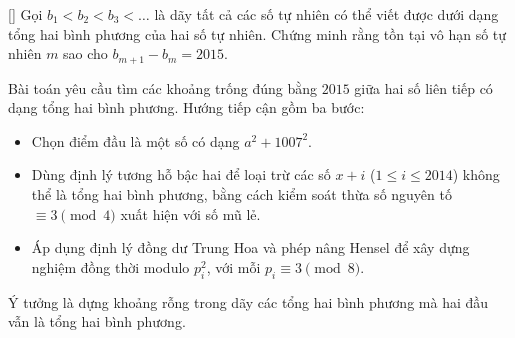 \documentclass[../09-contruction-methods.tex]{subfiles}
\begin{document}
\begin{example*}\label{example:IRN-2015-TST-D1-P3}[\textbf{}]
	Gọi \( b_1 < b_2 < b_3 < \dots \) là dãy tất cả các số tự nhiên có thể viết được dưới dạng tổng hai bình phương của hai số tự nhiên.
	Chứng minh rằng tồn tại vô hạn số tự nhiên \( m \) sao cho \( b_{m+1} - b_m = 2015 \).
\end{example*}

\begin{story*}
	Bài toán yêu cầu tìm các khoảng trống đúng bằng \( 2015 \) giữa hai số liên tiếp có dạng tổng hai bình phương.
	Hướng tiếp cận gồm ba bước:
	\begin{itemize}[topsep=0pt, partopsep=0pt, itemsep=0pt]
		\item Chọn điểm đầu là một số có dạng \( a^2 + 1007^2 \).
		\item Dùng định lý tương hỗ bậc hai để loại trừ các số \( x + i \) (\(1 \le i \le 2014\)) không thể là tổng hai bình phương, bằng cách kiểm soát thừa số nguyên tố \( \equiv 3 \pmod{4} \) xuất hiện với số mũ lẻ.
		\item Áp dụng định lý đồng dư Trung Hoa và phép nâng Hensel để xây dựng nghiệm đồng thời modulo \( p_i^2 \), với mỗi \( p_i \equiv 3 \pmod{8} \).
	\end{itemize}
	Ý tưởng là dựng khoảng rỗng trong dãy các tổng hai bình phương mà hai đầu vẫn là tổng hai bình phương.
\end{story*}

\bigbreak
\end{document}
